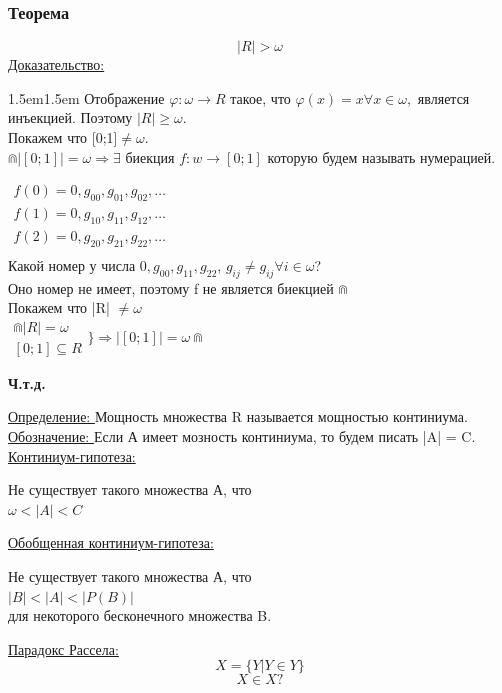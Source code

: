 \documentclass[12pt]{article}
\begin{document}
    \subsubsection*{Теорема }\label{th:}
    \[|R|> \omega\]
    \underline{Доказательство:}
    \begin{adjustwidth}{1.5em}{1.5em}
        Отображение $\varphi: \omega \rightarrow R$ такое, что $\varphi(x)=x \forall x \in \omega,$ является инъекцией.
        Поэтому $|R|\geq \omega$.\\
        Покажем что [0;1]$\not = \omega$.\\
        $\Cap |[0;1]|=\omega \Rightarrow \exists$ биекция $f:w \rightarrow [0;1]$ которую будем называть нумерацией.
    \end{adjustwidth}
    $\begin{matrix}
        f(0)=0,g_{00},g_{01},g_{02},\dots\\
        f(1)=0,g_{10},g_{11},g_{12},\dots\\
        f(2)=0,g_{20},g_{21},g_{22},\dots\\
    \end{matrix}$\\
    Какой номер у числа $0,g_{00},g_{11},g_{22}$, $g_{ij} \not = g_{ij} \forall i \in \omega$?\\
    Оно номер не имеет, поэтому f не является биекцией $\Cap$\\
    Покажем что |R| $\not = \omega$\\
    $\begin{matrix}
        \Cap |R| = \omega\\
        [0;1] \subseteq R 
    \end{matrix} \Bigg\} \Rightarrow |[0;1]| = \omega \Cap$
    \begin{center}
        \textbf{Ч.т.д.}
    \end{center}
    \underline{Определение: } Мощность множества R называется мощностью континиума.\\
    \underline{Обозначение: } Если А имеет мозность континиума, то будем писать |A| = C.\\
    \underline{Континиум-гипотеза: }\\
    \begin{center}
        Не существует такого множества А, что \\
        $\omega < |A| < C$
    \end{center}
    \underline{Обобщенная континиум-гипотеза: }
    \begin{center}
        Не существует такого множества А, что \\
        $|B| < |A|<|P(B)|$\\
        для некоторого бесконечного множества B.
    \end{center}
    \underline{Парадокс Рассела:}
    \[X=\{Y|Y \in Y\}\]
    \[X\in X ?\]
    
\end{document}
